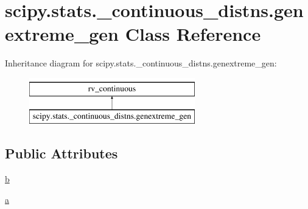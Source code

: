\hypertarget{classscipy_1_1stats_1_1__continuous__distns_1_1genextreme__gen}{}\section{scipy.\+stats.\+\_\+continuous\+\_\+distns.\+genextreme\+\_\+gen Class Reference}
\label{classscipy_1_1stats_1_1__continuous__distns_1_1genextreme__gen}
Inheritance diagram for scipy.\+stats.\+\_\+continuous\+\_\+distns.\+genextreme\+\_\+gen\+:\begin{figure}[H]
\begin{center}
\leavevmode
\includegraphics[height=2.000000cm]{classscipy_1_1stats_1_1__continuous__distns_1_1genextreme__gen}
\end{center}
\end{figure}
\subsection*{Public Attributes}
\begin{DoxyCompactItemize}
\item 
\hyperlink{classscipy_1_1stats_1_1__continuous__distns_1_1genextreme__gen_a45613e1da04c0002ffb67a40fdc76af0}{b}
\item 
\hyperlink{classscipy_1_1stats_1_1__continuous__distns_1_1genextreme__gen_ab0c83fd9dcfbf6c9f791f71a9a225ff6}{a}
\end{DoxyCompactItemize}


